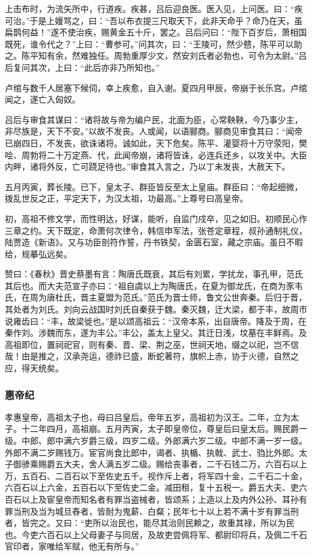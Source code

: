 \documentclass[]{article}
\begin{document}
上击布时，为流矢所中，行道疾。疾甚，吕后迎良医。医入见，上问医。曰：``疾可治。''于是上嫚骂之，曰：``吾以布衣提三尺取天下，此非天命乎？命乃在天，虽扁鹊何益！''遂不使治疾，赐黄金五十斤，罢之。吕后问曰：``陛下百岁后，萧相国既死，谁令代之？''上曰：``曹参可。''问其次，曰：``王陵可，然少戆，陈平可以助之。陈平知有余，然难独任。周勃重厚少文，然安刘氏者必勃也，可令为太尉。''吕后复问其次，上曰：``此后亦非乃所知也。''

卢绾与数千人居塞下候伺，幸上疾愈，自入谢。夏四月甲辰，帝崩于长乐宫。卢绾闻之，遂亡入匈奴。

吕后与审食其谋曰：``诸将故与帝为编户民，北面为臣，心常鞅鞅，今乃事少主，非尽族是，天下不安。''以故不发丧。人或闻，以语郦商。郦商见审食其曰：``闻帝已崩四日，不发丧，欲诛诸将。诚如此，天下危矣。陈平、灌婴将十万守荥阳，樊哙、周勃将二十万定燕、代，此闻帝崩，诸将皆诛，必连兵还乡，以攻关中。大臣内畔，诸将外反，亡可跷足待也。''审食其入言之，乃以丁未发丧，大赦天下。

五月丙寅，葬长陵。已下，皇太子、群臣皆反至太上皇庙。群臣曰：``帝起细微，拨乱世反之正，平定天下，为汉太祖，功最高。''上尊号曰高皇帝。

初，高祖不修文学，而性明达，好谋，能听，自监门戍卒，见之如旧。初顺民心作三章之约。天下既定，命萧何次律令，韩信申军法，张苍定章程，叔孙通制礼仪，陆贾造《新语》。又与功臣剖符作誓，丹书铁契，金匮石室，藏之宗庙。虽日不暇给，规摹弘远矣。

赞曰：《春秋》晋史蔡墨有言：陶唐氏既衰，其后有刘累，学扰龙，事孔甲，范氏其后也。而大夫范宣子亦曰：``祖自虞以上为陶唐氏，在夏为御龙氏，在商为豕韦氏，在周为唐杜氏，晋主夏盟为范氏。''范氏为晋士师，鲁文公世奔秦。后归于晋，其处者为刘氏。刘向云战国时刘氏自秦获于魏。秦灭魏，迁大梁，都于丰，故周市说雍齿曰：``丰，故梁徙也。''是以颂高祖云：``汉帝本系，出自唐帝。降及于周，在秦作刘。涉魏而东，遂为丰公。''丰公，盖太上皇父。其迁日浅，坟墓在丰鲜焉。及高祖即位，置祠祀官，则有秦、晋、梁、荆之巫，世祠天地，缀之以祀，岂不信哉！由是推之，汉承尧运，德祚已盛，断蛇著符，旗帜上赤，协于火德，自然之应，得天统矣。

\hypertarget{header-n155}{%
\subsubsection{惠帝纪}\label{header-n155}}

孝惠皇帝，高祖太子也，母曰吕皇后。帝年五岁，高祖初为汉王。二年，立为太子。十二年四月，高祖崩。五月丙寅，太子即皇帝位，尊皇后曰皇太后。赐民爵一级。中郎、郎中满六岁爵三级，四岁二级。外郎满六岁二级。中郎不满一岁一级。外郎不满二岁赐钱万。宦官尚食比郎中，谒者、执楯、执戟、武士、驺比外郎。太子御骖乘赐爵五大夫，舍人满五岁二级。赐给丧事者，二千石钱二万，六百石以上万，五百石、二百石以下至佐史五千。视作斥上者，将军四十金，二千石二十金，六百石以上六金，五百石以下至佐史二金。减田租，复十五税一。爵五大夫、吏六百石以上及宦皇帝而知名者有罪当盗械者，皆颂系；上造以上及内外公孙、耳孙有罪当刑及当为城旦舂者，皆耐为鬼薪、白粲；民年七十以上若不满十岁有罪当刑者，皆完之。又曰：``吏所以治民也，能尽其治则民赖之，故重其禄，所以为民也。今吏六百石以上父母妻子与同居，及故吏尝佩将军、都尉印将兵，及佩二千石官印者，家唯给军赋，他无有所与。''
\end{document}
